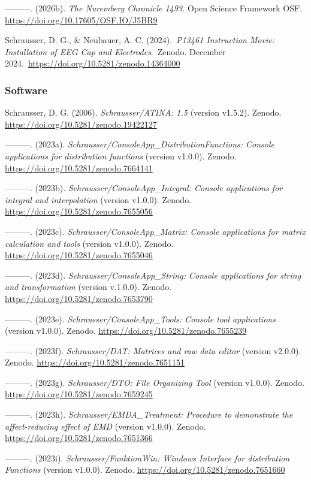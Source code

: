 \documentclass[
]{article}
\begin{document}
---------. (2026b). \emph{The Nuremberg Chronicle 1493.} Open Science
Framework OSF. \url{https://doi.org/10.17605/OSF.IO/J5BR9}

Schrausser, D. G., \& Neubauer, A. C. (2024).~\emph{P13461 Instruction
Movie: Installation of EEG Cap and Electrodes}.~Zenodo. December
2024.~\url{https://doi.org/10.5281/zenodo.14364000}

\hypertarget{software}{%
\subsubsection{Software}\label{software}}

Schrausser, D. G. (2006). \emph{Schrausser/ATINA: 1.5} (version v1.5.2).
Zenodo. \url{https://doi.org/10.5281/zenodo.19422127}

---------. (2023a). \emph{Schrausser/ConsoleApp\_DistributionFunctions:
Console applications for distribution functions} (version v1.0.0).
Zenodo. \url{https://doi.org/10.5281/zenodo.7664141}

---------. (2023b). \emph{Schrausser/ConsoleApp\_Integral: Console
applications for integral and interpolation} (version v1.0.0). Zenodo.
\url{https://doi.org/10.5281/zenodo.7655056}

---------. (2023c). \emph{Schrausser/ConsoleApp\_Matrix: Console
applications for matrix calculation and tools} (version v1.0.0). Zenodo.
\url{https://doi.org/10.5281/zenodo.7655046}

---------. (2023d). \emph{Schrausser/ConsoleApp\_String: Console
applications for string and transformation} (version v.1.0.0). Zenodo.
\url{https://doi.org/10.5281/zenodo.7653790}

---------. (2023e). \emph{Schrausser/ConsoleApp\_Tools: Console tool
applications} (version v1.0.0). Zenodo.
\url{https://doi.org/10.5281/zenodo.7655239}

---------. (2023f). \emph{Schrausser/DAT: Matrices and raw data editor}
(version v2.0.0). Zenodo. \url{https://doi.org/10.5281/zenodo.7651151}

---------. (2023g). \emph{Schrausser/DTO: File Organizing Tool} (version
v1.0.0). Zenodo. \url{https://doi.org/10.5281/zenodo.7659245}

---------. (2023h). \emph{Schrausser/EMDA\_Treatment: Procedure to
demonstrate the affect-reducing effect of EMD} (version v1.0.0). Zenodo.
\url{https://doi.org/10.5281/zenodo.7651366}

---------. (2023i). \emph{Schrausser/FunktionWin: Windows Interface for
distribution Functions} (version v1.0.0). Zenodo.
\url{https://doi.org/10.5281/zenodo.7651660}
\end{document}
